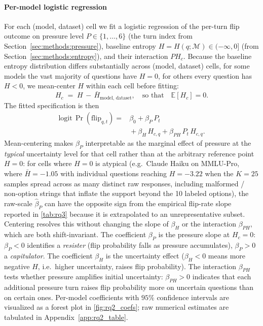 \paragraph{Per-model logistic regression}
For each (model, dataset) cell we fit a logistic regression of the
per-turn flip outcome on pressure level $P \in \{1, \ldots, 6\}$
(the turn index from Section~\ref{sec:methods:pressure}), baseline
entropy $H = H(q;\mathcal{M}) \in (-\infty, 0]$ (from
Section~\ref{sec:methods:entropy}), and their interaction $P H_c$.
Because the baseline entropy distribution differs substantially
across (model, dataset) cells, for some models the vast majority
of questions have $H = 0$, for others every question has $H < 0$,
we mean-center $H$ within each cell before fitting:
\[
H_c \;=\; H \,-\, \bar{H}_{\text{model, dataset}},
\quad\text{so that}\quad \mathbb{E}[H_c] = 0.
\]
The fitted specification is then
\[
\begin{aligned}
\mathrm{logit}\,\Pr(\mathrm{flip}_{q,t}) ={}& \beta_0 + \beta_P\,P_t \\
  & {} + \beta_H\,H_{c,q} + \beta_{PH}\,P_t\,H_{c,q}.
\end{aligned}
\]
Mean-centering makes $\beta_P$ interpretable as the marginal effect of pressure at the \emph{typical} uncertainty level for that cell rather than at the arbitrary reference point $H = 0$: for cells where $H = 0$ is atypical (e.g.\ Claude Haiku on MMLU-Pro, where $\bar H = -1.05$ with individual questions reaching $H = -3.22$ when the $K=25$ samples spread across as many distinct raw responses, including malformed / non-option strings that inflate the support beyond the 10 labeled options), the raw-scale $\hat\beta_P$ can have the opposite sign from the empirical flip-rate slope reported in \autoref{tab:rq3} because it is extrapolated to an unrepresentative subset. Centering resolves this without changing the slope of $\beta_H$ or the interaction $\beta_{PH}$, which are both shift-invariant. The coefficient $\beta_P$ is the pressure slope at $H_c = 0$: $\beta_P < 0$ identifies a \emph{resister} (flip probability falls as pressure accumulates), $\beta_P > 0$ a \emph{capitulator}. The coefficient $\beta_H$ is the uncertainty effect ($\beta_H < 0$ means more negative $H$, i.e.\ higher uncertainty, raises flip probability). The interaction $\beta_{PH}$ tests whether pressure amplifies initial uncertainty: $\beta_{PH} > 0$ indicates that each additional pressure turn raises flip probability more on uncertain questions than on certain ones. Per-model coefficients with $95\%$ confidence intervals are visualized as a forest plot in \autoref{fig:rq2_coefs}; raw numerical estimates are tabulated in Appendix~\ref{app:rq2_table}.

